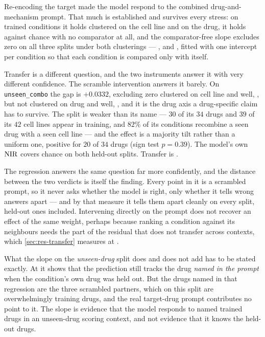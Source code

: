 %
\begin{claim}
  Re-encoding the target made the model respond to the combined drug-and-mechanism
  prompt. That much is established and survives every stress: on trained conditions
  it holds clustered on the cell line and on the drug, it holds against chance with
  no comparator at all, and the comparator-free slope excludes zero on all three
  splits under both clusterings --- ,
   and , fitted with one
  intercept per condition so that each condition is compared only with itself.
  
  Transfer is a different question, and the two instruments answer it with very
  different confidence. The scramble intervention answers it barely. On
  \texttt{unseen\_combo} the gap is $+0.0332$, excluding zero clustered on cell line
  and well, , but not clustered on drug and well,
  , and it is the drug axis a drug-specific claim has
  to survive. The split is weaker than its name --- $30$ of its $34$ drugs and $39$
  of its $42$ cell lines appear in training, and $82\%$ of its conditions recombine
  a seen drug with a seen cell line --- and the effect is a majority tilt rather
  than a uniform one, positive for $20$ of $34$ drugs (sign test $p = 0.39$). The
  model's own $\textrm{NIR}$ covers chance on both held-out splits. Transfer is
  \notestablished.
  
  The regression answers the same question far more confidently, and the distance
  between the two verdicts is itself the finding. Every point in it is a scrambled
  prompt, so it never asks whether the model is right, only whether it tells wrong
  answers apart --- and by that measure it tells them apart cleanly on every split,
  held-out ones included. Intervening directly on the prompt does not recover an
  effect of the same weight, perhaps because ranking a condition against its neighbours
  needs the part of the residual that does not transfer across contexts, which
  \cref{sec:res-transfer} measures at . 
  
  What the slope on the \emph{unseen-drug} split does and does not add has to be
  stated exactly. At  it shows that the prediction still
  tracks the drug \emph{named in the prompt} when the condition's own drug was held
  out. But the drugs named in that regression are the three scrambled partners,
  which on this split are overwhelmingly training drugs, and the real target-drug
  prompt contributes no point to it. The slope is evidence that the model responds
  to named trained drugs in an unseen-drug scoring context, and not evidence that it
  knows the held-out drugs.
  \end{claim}